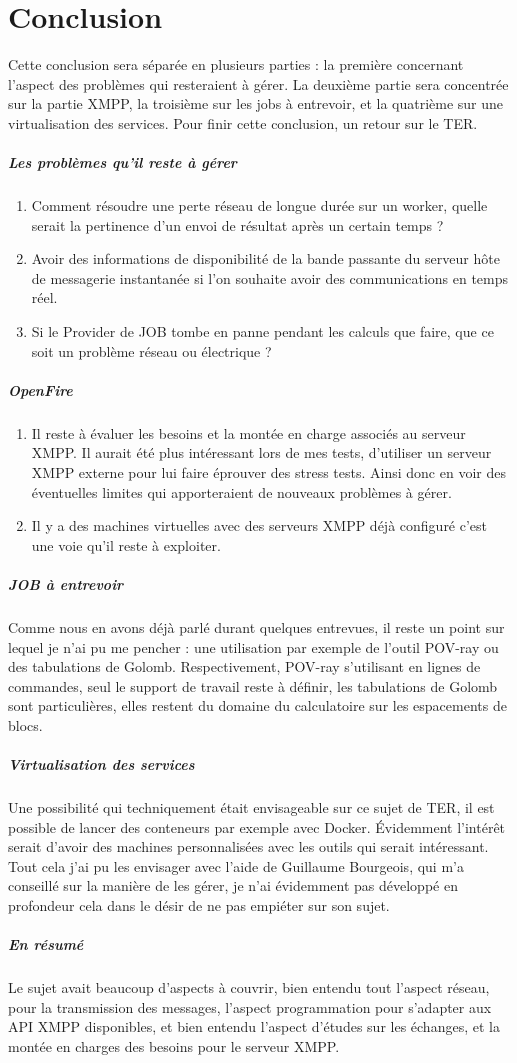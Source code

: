 \documentclass[11pt]{article}
\begin{document}
\newpage
\section{Conclusion}
Cette conclusion sera séparée en plusieurs parties : la première concernant l'aspect des problèmes qui resteraient à gérer. La deuxième partie sera concentrée sur la partie XMPP, la troisième sur les jobs à entrevoir, et la quatrième sur une virtualisation des services. Pour finir cette conclusion, un retour sur le TER.
\subparagraph{Les problèmes qu'il reste à gérer}
\begin{enumerate}
	\item Comment résoudre une perte réseau de longue durée sur un worker, quelle serait la pertinence d'un envoi de résultat après un certain temps ? 
	\item Avoir des informations de disponibilité de la bande passante du serveur hôte de messagerie instantanée si l'on souhaite avoir des communications en temps réel.
	\item Si le Provider de JOB tombe en panne pendant les calculs que faire, que ce soit un problème réseau ou électrique ?
\end{enumerate}
\subparagraph{OpenFire}
\begin{enumerate}
\item Il reste à évaluer les besoins et la montée en charge associés au serveur XMPP. Il aurait été plus intéressant lors de mes tests, d'utiliser un serveur XMPP externe pour lui faire éprouver des stress tests. Ainsi donc en voir des éventuelles limites qui apporteraient de nouveaux problèmes à gérer.
\item Il y a des machines virtuelles avec des serveurs XMPP déjà configuré c'est une voie qu'il reste à exploiter.
\end{enumerate}

\subparagraph{JOB à entrevoir} 
Comme nous en avons déjà parlé durant quelques entrevues, il reste un point sur lequel je n'ai pu me pencher : une utilisation par exemple de l'outil POV-ray ou des tabulations de Golomb. Respectivement, POV-ray s'utilisant en lignes de commandes, seul le support de travail reste à définir, les tabulations de Golomb sont particulières, elles restent du domaine du calculatoire sur les espacements de blocs. 
\subparagraph{Virtualisation des services}
Une possibilité qui techniquement était envisageable sur ce sujet de TER, il est possible de lancer des conteneurs par exemple avec Docker. Évidemment l’intérêt serait d'avoir des machines personnalisées avec les outils qui serait intéressant. Tout cela j'ai pu les envisager avec l'aide de Guillaume Bourgeois, qui m'a conseillé sur la manière de les gérer, je n'ai évidemment pas développé en profondeur cela dans le désir de ne pas empiéter sur son sujet.
\subparagraph{En résumé} 
Le sujet avait beaucoup d'aspects à couvrir, bien entendu tout l'aspect réseau, pour la transmission des messages, l'aspect programmation pour s'adapter aux API XMPP disponibles, et bien entendu l'aspect d’études sur les échanges, et la montée en charges des besoins pour le serveur XMPP.
\end{document}
